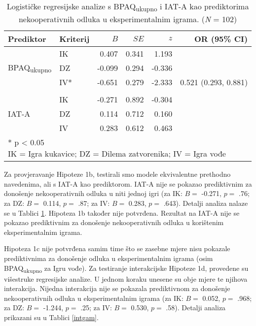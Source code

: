 \documentclass[a4paper, 12pt]{report}
\newcommand{\mti}[1]{\textit{#1}}
\begin{document}
\begin{table}
    \begin{center}
        \caption{\label{bivargameks} Logističke regresijske analize s
            BPAQ\textsubscript{ukupno} i IAT-A kao prediktorima nekooperativnih odluka u
            eksperimentalnim igrama. (\mti{N} = 102)}
        \hspace*{-0.7cm}\begin{tabular}{llrrrr}
        \toprule
        Prediktor& Kriterij & $B$ & $SE$ & $z$ & OR (95\% CI)\\
        \midrule
        \multirow{3}{*}{BPAQ\textsubscript{ukupno}}&IK & 0.407 & 0.341 & 1.193 &\\
        &DZ & -0.099 & 0.294 & -0.336 &\\
        &IV* & -0.651 & 0.279 & -2.333 & 0.521 (0.293, 0.881)\\
        &&&&\\
        \multirow{3}{*}{IAT-A}&IK & -0.271 & 0.892 & -0.304 &\\
        &DZ & 0.114 & 0.712 & 0.160 &\\
        &IV & 0.283 & 0.612 & 0.463 &\\
        \bottomrule
        \multicolumn{6}{l}{
            \parbox{9cm}{\scriptsize \vspace{3pt} 
                * p < 0.05\\
                IK = Igra kukavice; DZ = Dilema zatvorenika; IV = Igra vođe
        }}
    \end{tabular}
\end{center}
\end{table}

Za provjeravanje Hipoteze 1b, testirali smo modele ekvivalentne prethodno
navedenima, ali s IAT-A kao prediktorom. IAT-A nije se pokazao prediktivnim za
donošenje nekooperativnih odluka u niti jednoj igri (za IK: $B =$ -0.271, $p =$
.76; za DZ: $B =$ 0.114, $p =$ .87; za IV: $B =$ 0.283, $p =$ .643). Detalji analiza nalaze se u
Tablici \ref{bivargameks}. Hipoteza 1b također nije potvrđena. Rezultat na IAT-A
nije se pokazao prediktivnim za donošenje nekooperativnih odluka u korištenim
eksperimentalnim igrama.

Hipoteza 1c nije potvrđena samim time što se zasebne mjere nisu pokazale
prediktivnima za donošenje odluka u eksperimentalnim igrama (osim
BPAQ\textsubscript{ukupno} za Igru vođe). Za testiranje interakcijske Hipoteze
1d, provedene su  višestruke regresijske analize. U jednom koraku unesene su
obje mjere te njihova interakcija. Nijedna interakcija nije se pokazala
prediktivnom za donošenje nekooperativnih odluka u eksperimentalnim igrama (za
IK: $B =$ 0.052, $p =$ .968; za DZ: $B =$ -1.244, $p =$ .25; za IV: $B =$
0.530, $p =$ .58). Detalji analiza prikazani su u Tablici \ref{intgam}.
\end{document}
